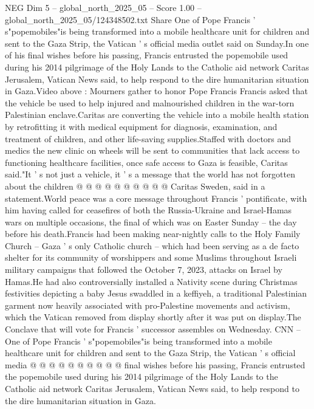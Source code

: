 \begin{textsample}{NEG Dim 5 – global\_north\_2025\_05 – Score 1.00 – global\_north\_2025\_05/124348502.txt}  \label{ex:f5_neg_375}
Share One of Pope Francis ' s"popemobiles"is being transformed into a mobile healthcare unit for children and sent to the Gaza Strip, the Vatican ' s official media outlet said on Sunday.In one of his final wishes before his passing, Francis entrusted the popemobile used during his 2014 pilgrimage of the Holy Lands to the Catholic aid network Caritas Jerusalem, Vatican News said, to help respond to the dire humanitarian situation in Gaza.Video above : Mourners gather to honor Pope Francis Francis asked that the vehicle be used to help injured and malnourished children in the war-torn Palestinian enclave.Caritas are converting the vehicle into a mobile health station by retrofitting it with medical equipment for diagnosis, examination, and treatment of children, and other life-saving supplies.Staffed with doctors and medics the new clinic on wheels will be sent to communities that lack access to functioning healthcare facilities, once safe access to Gaza is feasible, Caritas said."It ' s not just a vehicle, it ' s a message that the world has not forgotten about the children @ @ @ @ @ @ @ @ @ @ Caritas Sweden, said in a statement.World peace was a core message throughout Francis ' pontificate, with him having called for ceasefires of both the Russia-Ukraine and Israel-Hamas wars on multiple occasions, the final of which was on Easter Sunday -- the day before his death.Francis had been making near-nightly calls to the Holy Family Church -- Gaza ' s only Catholic church -- which had been serving as a de facto shelter for its community of worshippers and some Muslims throughout Israeli military campaigns that followed the October 7, 2023, attacks on Israel by Hamas.He had also controversially installed a Nativity scene during Christmas festivities depicting a baby Jesus swaddled in a keffiyeh, a traditional Palestinian garment now heavily associated with pro-Palestine movements and activism, which the Vatican removed from display shortly after it was put on display.The Conclave that will vote for Francis ' successor assembles on Wednesday.
CNN -- One of Pope Francis ' s"popemobiles"is being transformed into a mobile healthcare unit for children and sent to the Gaza Strip, the Vatican ' s official media @ @ @ @ @ @ @ @ @ @ final wishes before his passing, Francis entrusted the popemobile used during his 2014 pilgrimage of the Holy Lands to the Catholic aid network Caritas Jerusalem, Vatican News said, to help respond to the dire humanitarian situation in Gaza.

\end{textsample}
